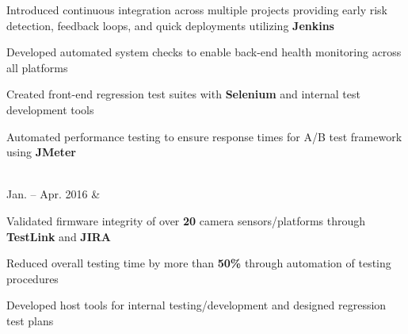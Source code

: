 \documentclass[]{richard-dang}
\begin{document}
\begin{tabularcv}
                    \begin{tabitemize}
                        \item Introduced continuous integration across multiple projects providing early risk detection, feedback loops, and quick deployments utilizing \textbf{Jenkins}
                        \item Developed automated system checks to enable back-end health monitoring across all platforms
                        \item Created front-end regression test suites with \textbf{Selenium} and internal test development tools 
                        \item Automated performance testing to ensure response times for A/B test framework using \textbf{JMeter}
                    \end{tabitemize} 
                    \\[\vspacepar] 
    Jan. – \newline 
    Apr. 2016   &   
                    \href{http://geosemi.com}{
                    }
                    \begin{tabitemize}
                        \item Validated firmware integrity of over \textbf{20} camera sensors/platforms through \textbf{TestLink} and \textbf{JIRA}
                        \item Reduced overall testing time by more than \textbf{50\%} through automation of testing procedures
                        \item Developed host tools for internal testing/development and designed regression test plans
                    \end{tabitemize} 
\end{tabularcv}   
\end{document}
